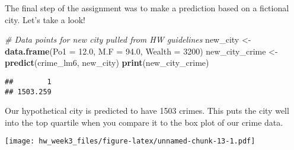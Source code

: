 \documentclass[]{article}
\newenvironment{Shaded}{\begin{snugshade}}{\end{snugshade}}
\newcommand{\KeywordTok}[1]{\textcolor[rgb]{0.13,0.29,0.53}{\textbf{#1}}}
\newcommand{\DataTypeTok}[1]{\textcolor[rgb]{0.13,0.29,0.53}{#1}}
\newcommand{\DecValTok}[1]{\textcolor[rgb]{0.00,0.00,0.81}{#1}}
\newcommand{\FloatTok}[1]{\textcolor[rgb]{0.00,0.00,0.81}{#1}}
\newcommand{\StringTok}[1]{\textcolor[rgb]{0.31,0.60,0.02}{#1}}
\newcommand{\CommentTok}[1]{\textcolor[rgb]{0.56,0.35,0.01}{\textit{#1}}}
\newcommand{\OperatorTok}[1]{\textcolor[rgb]{0.81,0.36,0.00}{\textbf{#1}}}
\newcommand{\NormalTok}[1]{#1}
\begin{document}
The final step of the assignment was to make a prediction based on a
fictional city. Let's take a look!

\begin{Shaded}
\begin{Highlighting}[]
\CommentTok{# Data points for new city pulled from HW guidelines}
\NormalTok{new_city <-}\StringTok{ }\KeywordTok{data.frame}\NormalTok{(}\DataTypeTok{Po1 =} \FloatTok{12.0}\NormalTok{, }\DataTypeTok{M.F =} \FloatTok{94.0}\NormalTok{, }\DataTypeTok{Wealth =} \DecValTok{3200}\NormalTok{)}
\NormalTok{new_city_crime <-}\StringTok{ }\KeywordTok{predict}\NormalTok{(crime_lm6, new_city)}
\KeywordTok{print}\NormalTok{(new_city_crime)}
\end{Highlighting}
\end{Shaded}

\begin{verbatim}
##        1 
## 1503.259
\end{verbatim}

Our hypothetical city is predicted to have 1503 crimes. This puts the
city well into the top quartile when you compare it to the box plot of
our crime data.

\begin{Shaded}
\end{Shaded}

\texttt{[image: hw\_week3\_files/figure-latex/unnamed-chunk-13-1.pdf]}
\end{document}
